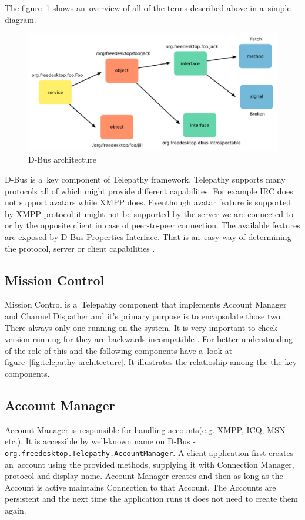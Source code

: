 The figure~\ref{fig:dbusArchitecture} shows an~overview of all of the terms described above in a~simple diagram.

\begin{figure}[ht]
\begin{center}
	\includegraphics[width=15cm]{fig/dbus-architecture-overview.png}
	\caption{D-Bus architecture \cite{TPWiki}}
	\label{fig:dbusArchitecture}
\end{center}
\end{figure}

D-Bus is a~key component of Telepathy framework. Telepathy supports many protocols all of which might provide different capabilites. For example IRC does not support avatars while XMPP does. Eventhough avatar feature is supported by XMPP protocol it might not be supported by the server we are connected to or by the opposite client in case of peer-to-peer connection. The available features are exposed by D-Bus Properties Interface. That is an~easy way of determining the protocol, server or client capabilities \cite{dbus}.

\subsection*{Mission Control}
Mission Control is a~Telepathy component that implements Account Manager and Channel Dispather and it's primary purpose is to encapsulate those two. There always only one running on the system. It is very important to check version running for they are backwards incompatible \cite{TPWiki}. For better understanding of the role of this and the following components have a~look at figure~\ref{fig:telepathy-architecture}. It illustrates the relatioship among the the key components.

\subsection*{Account Manager}
Account Manager is responsible for handling accounts(e.g. XMPP, ICQ, MSN etc.). It is accessible by well-known name on D-Bus - \verb|org.freedesktop.Telepathy.AccountManager|. A client application first creates an~account using the provided methods, supplying it with Connection Manager, protocol and display name. Account Manager creates and then as long as the Account is active maintains Connection to that Account. The Accounts are persistent and the next time the application runs it does not need to create them again. 

